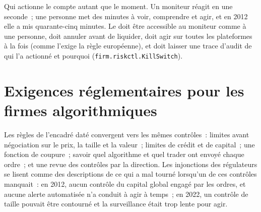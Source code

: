 \begin{omfigure}

\label{fig:hf:risk-controls:tradeoff}
\end{omfigure}

Qui actionne le  compte autant que le moment. Un moniteur réagit en une seconde~; une personne met des minutes à voir, comprendre et agir, et en 2012 elle a mis
quarante-cinq minutes. Le  doit être accessible au moniteur comme à une personne, doit annuler avant de liquider, doit agir sur toutes les plateformes à la fois (comme
l'exige la règle européenne), et doit laisser une trace d'audit de qui l'a actionné et pourquoi (\texttt{firm.riskctl.KillSwitch}).

\section{Exigences réglementaires pour les firmes algorithmiques}

Les règles de l'encadré daté convergent vers les mêmes contrôles~: limites avant négociation sur le prix, la taille et la valeur~; limites de crédit et de capital~; une fonction
de coupure~; savoir quel algorithme et quel trader ont envoyé chaque ordre~; et une revue des contrôles par la direction. Les injonctions des régulateurs se lisent comme des descriptions
de ce qui a mal tourné lorsqu'un de ces contrôles manquait~: en 2012, aucun contrôle du capital global engagé par les ordres, et aucune alerte automatisée n'a conduit à agir
à temps~; en 2022, un contrôle de taille pouvait être contourné et la surveillance était trop lente pour agir.

